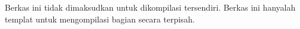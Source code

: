 \documentclass[openany]{memoir}
\begin{document}
Berkas ini tidak dimaksudkan untuk dikompilasi tersendiri. Berkas ini
hanyalah templat untuk mengompilasi bagian secara terpisah.
\end{document}
